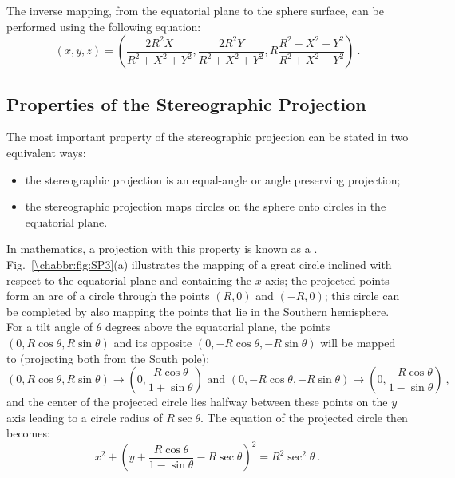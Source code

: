 The inverse mapping, from the equatorial plane to the sphere surface, can be performed using the following equation:
\begin{equation}
	(x,y,z) = \left( \frac{2R^2X}{R^2+X^2+Y^2}, \frac{2R^2Y}{R^2+X^2+Y^2}, R\frac{R^2-X^2-Y^2}{R^2+X^2+Y^2}\right)\ .\label{\chabbr:eq:SPinv}
\end{equation}


\subsection{Properties of the Stereographic Projection}\label{\chabbr:sec:SPprops}

The most important property of the stereographic projection can be  stated in two equivalent ways:
\begin{itemize}
	\item the stereographic projection is an equal-angle or angle preserving projection;
	\item  the stereographic projection maps circles on the sphere onto circles in the equatorial plane.
\end{itemize}
In mathematics, a projection with this property is known as a .  Fig.~\ref{\chabbr:fig:SP3}(a) illustrates the mapping of a great circle inclined with respect to the equatorial plane and containing the $x$ axis; the projected points form an arc of a circle through the points $(R,0)$ and $(-R,0)$; this circle can be completed by also mapping the points that lie in the Southern hemisphere. For a tilt angle of $\theta$ degrees above the equatorial plane, the points $(0,R\cos\theta,R\sin\theta)$ and its opposite $(0,-R\cos\theta,-R\sin\theta)$ will be mapped to (projecting both from the South pole):
\[
	(0,R\cos\theta,R\sin\theta)\rightarrow \left(0, \frac{R\cos\theta}{1+\sin\theta}\right)\text{ and }(0,-R\cos\theta,-R\sin\theta)\rightarrow \left(0, \frac{-R\cos\theta}{1-\sin\theta}\right)\ ,
\]
and the center of the projected circle lies halfway between these points on the $y$ axis leading to a circle radius of $R\sec\theta$.  The equation of the projected circle then becomes:
\[
	x^2+\left(y+\frac{R\cos\theta}{1-\sin\theta}-R\sec\theta\right)^2  = R^2\sec^2\theta\ .
\]


